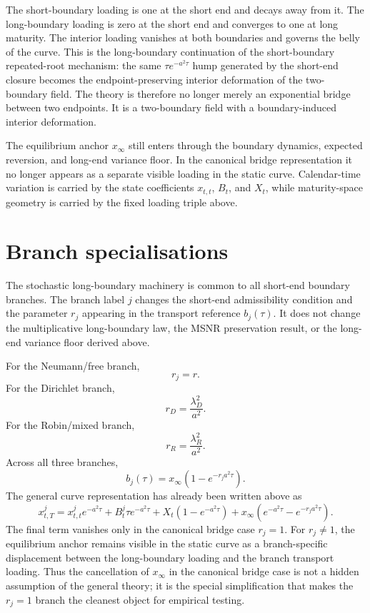 \documentclass[11pt]{article}
\begin{document}
The short-boundary loading is one at the short end and decays away from it. The long-boundary loading is zero at the short end and converges to one at long maturity. The interior loading vanishes at both boundaries and governs the belly of the curve. This is the long-boundary continuation of the short-boundary repeated-root mechanism: the same \(\tau e^{-a^2\tau}\) hump generated by the short-end closure becomes the endpoint-preserving interior deformation of the two-boundary field. The theory is therefore no longer merely an exponential bridge between two endpoints. It is a two-boundary field with a boundary-induced interior deformation.

The equilibrium anchor \(x_\infty\) still enters through the boundary dynamics, expected reversion, and long-end variance floor. In the canonical bridge representation it no longer appears as a separate visible loading in the static curve. Calendar-time variation is carried by the state coefficients \(x_{t,t}\), \(B_t\), and \(X_t\), while maturity-space geometry is carried by the fixed loading triple above.

\section{Branch specialisations}

The stochastic long-boundary machinery is common to all short-end boundary branches. The branch label \(j\) changes the short-end admissibility condition and the parameter \(r_j\) appearing in the transport reference \(b_j(\tau)\). It does not change the multiplicative long-boundary law, the MSNR preservation result, or the long-end variance floor derived above.

For the Neumann/free branch,
\[
r_j=r.
\]
For the Dirichlet branch,
\[
r_D=\frac{\lambda_D^2}{a^2}.
\]
For the Robin/mixed branch,
\[
r_R=\frac{\lambda_R^2}{a^2}.
\]
Across all three branches,
\[
b_j(\tau)
=
x_\infty\left(1-e^{-r_j a^2\tau}\right).
\]
The general curve representation has already been written above as
\[
x^j_{t,T}
=
x^j_{t,t}e^{-a^2\tau}
+
B^j_t\tau e^{-a^2\tau}
+
X_t\left(1-e^{-a^2\tau}\right)
+
x_\infty\left(e^{-a^2\tau}-e^{-r_j a^2\tau}\right).
\]
The final term vanishes only in the canonical bridge case \(r_j=1\). For \(r_j\neq1\), the equilibrium anchor remains visible in the static curve as a branch-specific displacement between the long-boundary loading and the branch transport loading. Thus the cancellation of \(x_\infty\) in the canonical bridge case is not a hidden assumption of the general theory; it is the special simplification that makes the \(r_j=1\) branch the cleanest object for empirical testing.
\end{document}

